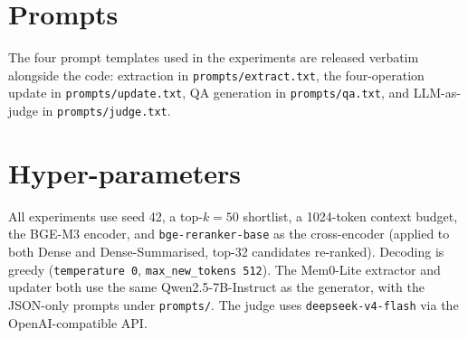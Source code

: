 \documentclass[11pt]{article}
\begin{document}


\appendix

\section{Prompts}
\sloppy
The four prompt templates used in the experiments are released
verbatim alongside the code: extraction in
\texttt{prompts/extract.txt}, the four-operation update in
\texttt{prompts/update.txt}, QA generation in
\texttt{prompts/qa.txt}, and LLM-as-judge in
\texttt{prompts/judge.txt}.

\section{Hyper-parameters}
\sloppy
All experiments use seed 42, a top-$k{=}50$ shortlist, a 1024-token
context budget, the BGE-M3 encoder, and
\texttt{bge-reranker-base} as the cross-encoder (applied to both
Dense and Dense-Summarised, top-32 candidates re-ranked). Decoding
is greedy (\texttt{temperature 0}, \texttt{max\_new\_tokens 512}).
The Mem0-Lite extractor and updater both use the same
Qwen2.5-7B-Instruct as the generator, with the JSON-only prompts
under \texttt{prompts/}. The judge uses \texttt{deepseek-v4-flash}
via the OpenAI-compatible API.
\end{document}
